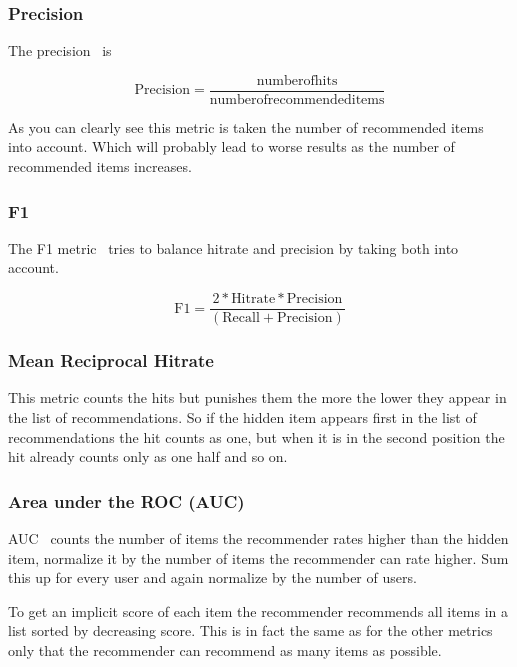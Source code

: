 \subsubsection{Precision}

The precision~\cite{Sarwar00applicationof} is 

\[
\textrm{Precision}=\frac{\textrm{numberofhits}}{\textrm{numberofrecommendeditems}}
\]


As you can clearly see this metric is taken the number of recommended
items into account. Which will probably lead to worse results as the
number of recommended items increases.


\subsubsection{F1}

The F1 metric~\cite{Sarwar00applicationof} tries to balance hitrate and precision
by taking both into account.

\[
\textrm{F1}=\frac{2*\textrm{Hitrate}*\textrm{Precision}}{(\textrm{Recall}+\textrm{Precision})}
\]
 


\subsubsection{Mean Reciprocal Hitrate}

This metric counts the hits but punishes them the more the lower they
appear in the list of recommendations. So if the hidden item appears
first in the list of recommendations the hit counts as one, but when
it is in the second position the hit already counts only as one half
and so on. 


\subsubsection{Area under the ROC (AUC)}

AUC~\cite{Rendle:2009:BBP:1795114.1795167} counts the number of items the recommender rates
higher than the hidden item, normalize it by the number of items the
recommender can rate higher. Sum this up for every user and again
normalize by the number of users.

To get an implicit score of each item the recommender recommends all
items in a list sorted by decreasing score. This is in fact the same
as for the other metrics only that the recommender can recommend as
many items as possible.


